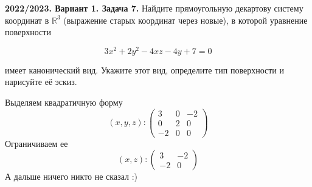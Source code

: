 \documentclass[a4paper]{article}
\begin{document}
\newpage

\begin{tcolorbox}[colback=blue!20!white, colframe=black!100!black]
     \textbf{2022/2023. Вариант 1. Задача 7.} Найдите прямоугольную декартову систему координат в $\mathbb{R}^{3}$ (выражение старых координат через новые), в которой уравнение поверхности

$$
3 x^{2}+2 y^{2}-4 x z-4 y+7=0
$$

имеет канонический вид. Укажите этот вид, определите тип поверхности и нарисуйте её эскиз.
\end{tcolorbox}
\indent Выделяем квадратичную форму
$$(x,y,z):\begin{pmatrix}
    3&0&-2\\
    0&2&0\\
    -2&0&0
\end{pmatrix}$$
\indent Ограничиваем ее
$$(x,z):\begin{pmatrix}
    3&-2\\
    -2&0
\end{pmatrix}$$
\indent А дальше ничего никто не сказал :)\\[2mm]

\end{document}
